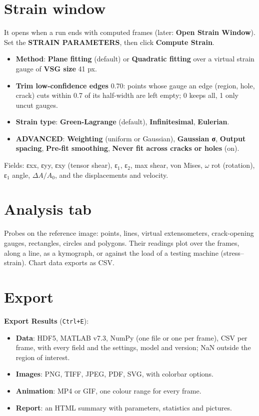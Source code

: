 \documentclass[10pt,letterpaper,twocolumn]{article}
\newcommand{\ui}[1]{\textbf{#1}}
\begin{document}
\section{Strain window}
It opens when a run ends with computed frames (later: \ui{Open Strain Window}). Set the \ui{STRAIN PARAMETERS}, then
click \ui{Compute Strain}.
\begin{itemize}
  \item \ui{Method}: \ui{Plane fitting} (default) or \ui{Quadratic fitting} over a virtual strain
        gauge of \ui{VSG size} 41 px.
  \item \ui{Trim low-confidence edges} 0.70: points whose gauge an edge (region, hole, crack) cuts
        within 0.7 of its half-width are left empty; 0 keeps all, 1 only uncut gauges.
  \item \ui{Strain type}: \ui{Green-Lagrange} (default), \ui{Infinitesimal}, \ui{Eulerian}.
  \item \ui{ADVANCED}: \ui{Weighting} (uniform or Gaussian), \ui{Gaussian σ}, \ui{Output spacing},
        \ui{Pre-fit smoothing}, \ui{Never fit across cracks or holes} (on).
\end{itemize}
Fields: εxx, εyy, εxy (tensor shear), ε\(_1\), ε\(_2\), max shear, von Mises, \(\omega\) rot
(rotation), ε\(_1\) angle, \(\Delta A/A_0\), and the displacements and velocity.

\section{Analysis tab}
Probes on the reference image: points, lines, virtual extensometers, crack-opening gauges,
rectangles, circles and polygons. Their readings plot over the frames, along a line, as a
kymograph, or against the load of a testing machine (stress--strain). Chart data exports as CSV.

\section{Export}
\ui{Export Results} (\texttt{Ctrl+E}):
\begin{itemize}
  \item \ui{Data}: HDF5, MATLAB v7.3, NumPy (one file or one per frame), CSV per frame, with every
        field and the settings, model and version; NaN outside the region of interest.
  \item \ui{Images}: PNG, TIFF, JPEG, PDF, SVG, with colorbar options.
  \item \ui{Animation}: MP4 or GIF, one colour range for every frame.
  \item \ui{Report}: an HTML summary with parameters, statistics and pictures.
\end{itemize}
\end{document}
